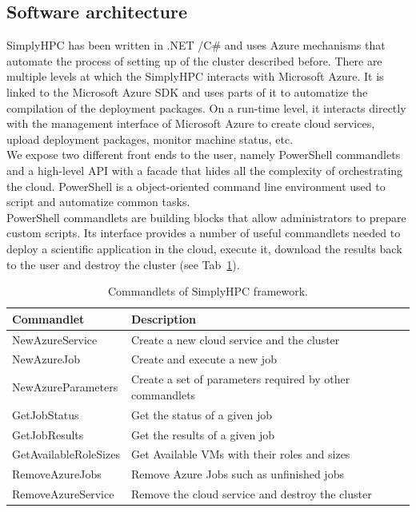 \documentclass[3p,times]{elsarticle}
\begin{document}
\subsection{Software architecture}

SimplyHPC has been written in .NET  /C\# and uses Azure mechanisms that automate the process of setting up of the cluster described before. There are multiple levels at which the SimplyHPC interacts with Microsoft Azure. It is linked to the Microsoft Azure SDK and uses parts of it to automatize the compilation of the deployment packages. On a run-time level, it interacts directly with the management interface of Microsoft Azure to create cloud services, upload deployment packages, monitor machine status, etc.\\
We expose two different front ends to the user, namely PowerShell commandlets and a high-level API with a facade that hides all the complexity of orchestrating the cloud.  PowerShell is a object-oriented command line environment used to script and automatize common tasks.\\
PowerShell commandlets are building blocks that allow administrators to prepare custom scripts. Its interface provides a number of useful commandlets needed to deploy a scientific application in the cloud, execute it, download the results back to the user and destroy the cluster (see Tab~\ref{tab:CommandletsOfSimplyHPC}). 

\begin{table}
	\centering		
		\begin{tabular}{|l|l|}
		\hline
      \textbf{Commandlet} & \textbf{Description} \\ \hline
      NewAzureService & Create a new cloud service and the cluster \\ \hline
			NewAzureJob & Create and execute a new job \\ \hline
			NewAzureParameters & Create a set of parameters required by other commandlets    \\ \hline
			GetJobStatus & Get the status of a given job    \\ \hline
			GetJobResults & Get the results of a given job  \\ \hline
			GetAvailableRoleSizes & Get Available VMs with their roles and sizes \\ \hline
			RemoveAzureJobs & Remove Azure Jobs such as unfinished jobs \\ \hline
			RemoveAzureService & Remove the cloud service and destroy the cluster \\ \hline
    \end{tabular}
	\caption{Commandlets of SimplyHPC framework.}
	\label{tab:CommandletsOfSimplyHPC}
\end{table}
\end{document}
